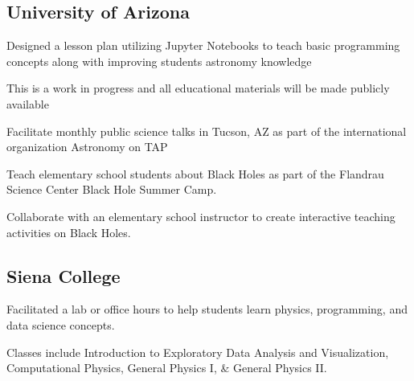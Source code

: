 \documentclass[a4paper, 12pt]{article}
\begin{document}
\vspace*{8pt}
\subsection{{University of Arizona}}
\begin{zitemize}
    \item Designed a lesson plan utilizing Jupyter Notebooks to teach basic programming concepts along with improving students astronomy knowledge
    \item This is a work in progress and all educational materials will be made publicly available
\end{zitemize}

\vspace*{5pt}
\begin{zitemize}
    \item Facilitate monthly public science talks in Tucson, AZ as part of the international organization Astronomy on TAP
\end{zitemize}

\vspace*{5pt}
\begin{zitemize}
    \item Teach elementary school students about Black Holes as part of the Flandrau Science Center Black Hole Summer Camp.
    \item Collaborate with an elementary school instructor to create interactive teaching activities on Black Holes.
\end{zitemize}

\vspace*{8pt}
\subsection {{Siena College}}
\begin{zitemize}
\item Facilitated a lab or office hours to help students learn physics, programming, and data science concepts.
\item Classes include Introduction to Exploratory Data Analysis and Visualization, Computational Physics, General Physics I, \& General Physics II.
\end{zitemize}
\end{document}
